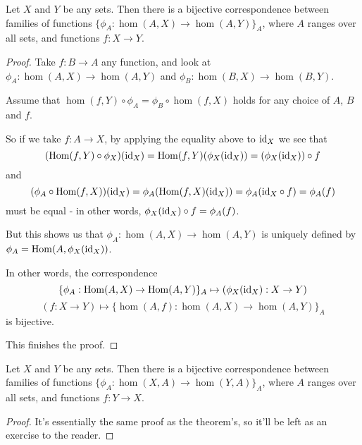 \begin{theorem}\label{thm:yoneda}
	Let $X$ and $Y$ be any sets. Then there is a bijective correspondence between families of functions $\{\phi_A:\hom(A,X)\to \hom(A,Y)\}_A$, where $A$ ranges over all sets, and functions $f:X\to Y$.
\end{theorem}
\begin{proof}
	Take $f:B\to A$ any function, and look at $\phi_A:\hom(A,X)\to\hom(A,Y)$ and $\phi_B:\hom(B,X)\to\hom(B,Y)$.
	
	Assume that $\hom(f,Y)\circ\phi_A=\phi_B\circ\hom(f,X)$ holds for any choice of $A$, $B$ and $f$.
	
	So if we take $f:A\to X$, by applying the equality above to ${\rm id}_X$ we see that
	\[(\mathrm{Hom}(f,Y)\circ\phi_X)({\rm id}_X)=\mathrm{Hom}(f,Y)(\phi_X({\rm id}_X))=(\phi_X({\rm id}_X))\circ f\]and
	\[(\phi_A\circ\mathrm{Hom}(f,X))({\rm id}_X)=\phi_A(\mathrm{Hom}(f,X)({\rm id}_X))=\phi_A({\rm id}_X\circ f)=\phi_A(f)\]must be equal - in other words, $\phi_X({\rm id}_X)\circ f=\phi_A(f)$.
	
	But this shows us that $\phi_A:\hom(A,X)\to\hom(A,Y)$ is uniquely defined by $\phi_A=\mathrm{Hom}(A,\phi_X({\rm id}_X))$. 
	
	In other words, the correspondence
	\[\{\phi_A:\mathrm{Hom}(A,X)\to\mathrm{Hom}(A,Y)\}_A\mapsto (\phi_X({\rm id}_X):X\to Y)\]
	\[(f:X\to Y)\mapsto\{\hom(A,f):\hom(A,X)\to\hom(A,Y)\}_A\]is bijective.
	
	This finishes the proof.
\end{proof}
\begin{cor}
	Let $X$ and $Y$ be any sets. Then there is a bijective correspondence between families of functions $\{\phi_A:\hom(X,A)\to \hom(Y,A)\}_A$, where $A$ ranges over all sets, and functions $f:Y\to X$.
\end{cor}
\begin{proof}
	It's essentially the same proof as the theorem's, so it'll be left as an exercise to the reader.
\end{proof}

